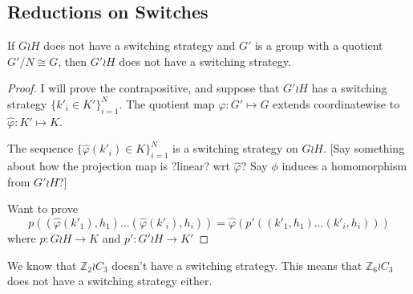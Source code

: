 \subsection{Reductions on Switches}
\begin{theorem}
  If $G \wr H$ does not have a switching strategy and $G'$ is a group with
  a quotient $G'/N \cong G$, then ${G'} \wr H$ does not have a switching
  strategy.
  \label{thm:SwitchReduction}
\end{theorem}
\begin{proof}
  I will prove the contrapositive, and suppose that $G' \wr H$ has a
  switching strategy $\{k'_i \in K'\}_{i=1}^N$. The quotient map
  $\varphi\colon G' \mapsto G$
  extends coordinatewise to
  $\hat\varphi \colon K' \mapsto K$.

  The sequence $\{\hat\varphi(k'_i) \in K\}_{i=1}^N$ is a switching strategy on
  $G \wr H$.
  [Say something about how the projection map is ?linear? wrt $\hat\varphi$?
  Say $\phi$ induces a homomorphism from $G' \wr H$?]

  Want to prove \[
    p((\hat\varphi(k'_1),h_1)\dots(\hat\varphi(k'_i),h_i)) =
    \hat\varphi(p'((k'_1,h_1)\dots(k'_i,h_i)))
  \] where $p \colon G \wr H \rightarrow K$ and $p' \colon G' \wr H \rightarrow K'$
\end{proof}
\begin{example}
  We know that $\mathbb Z_2 \wr C_3$ doesn't have a switching strategy.
  This means that $\mathbb Z_6 \wr C_3$ does not have a switching strategy either.
\end{example}
